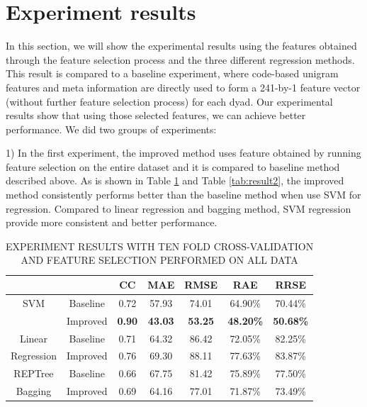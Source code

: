 \documentclass[11pt]{article} %
\begin{document}
\section{Experiment results}
In this section, we will show the experimental results using the features obtained through the feature selection process and the three different regression methods. This result is compared to a baseline experiment, where code-based unigram features and meta information are directly used to form a 241-by-1 feature vector (without further feature selection process) for each dyad. Our experimental results show that using those selected features, we can achieve better performance. We did two groups of experiments:

1) In the first experiment, the improved method uses feature obtained by running feature selection on the entire dataset and it is compared to baseline method described above. As is shown in Table \ref{tab:result1} and Table \ref{tab:result2}, the improved method consistently performs better than the baseline method when use SVM for regression. Compared to linear regression and bagging method, SVM regression provide more consistent and better performance.

\begin{table}
  \centering
  \caption{EXPERIMENT RESULTS WITH TEN FOLD CROSS-VALIDATION AND FEATURE SELECTION PERFORMED ON ALL DATA}
  \begin{tabular}{|c|c|c|c|c|c|c|}
     \hline
         &       & CC & MAE & RMSE & RAE & RRSE\\
     \hline
     SVM & Baseline & 0.72  & 57.93  & 74.01  & 64.90\%  & 70.44\%\\
         & Improved & \textbf{0.90}  & \textbf{43.03}  & \textbf{53.25}  & \textbf{48.20\%}  & \textbf{50.68\%}\\
     \hline
  Linear & Baseline &  0.71 & 64.32  & 86.42  & 72.05\% & 82.25\%\\
  Regression & Improved & 0.76  & 69.30  & 88.11  & 77.63\%  & 83.87\%  \\
  \hline
  REPTree & Baseline &  0.66 & 67.75  & 81.42  & 75.89\%  & 77.50\%\\
  Bagging & Improved &  0.69 & 64.16  & 77.01  & 71.87\%  & 73.49\%\\
  \hline
  \end{tabular}\label{tab:result1}
\end{table}
\end{document}
